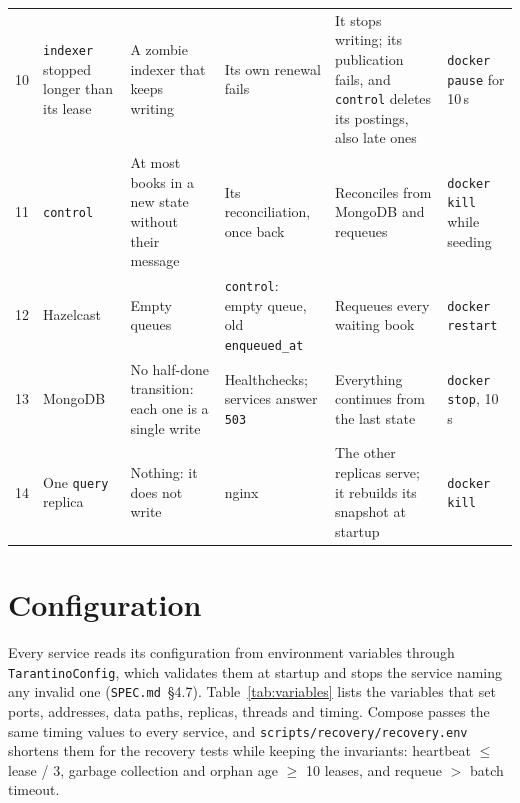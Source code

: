 \documentclass[11pt,a4paper]{article}
\newcommand{\code}[1]{\nolinkurl{#1}}
\newcommand{\spec}[1]{\code{SPEC.md}~\S#1}
\begin{document}
\begin{table}[!ht]
\begin{tabularx}{\textwidth}{@{}L{0.65cm}L{2.75cm}L{2.85cm}L{2.2cm}YL{2.65cm}@{}}
10 & \code{indexer} stopped longer than its lease & A zombie indexer that keeps writing & Its own renewal fails & It stops writing; its publication fails, and \code{control} deletes its postings, also late ones & \code{docker pause} for 10\,s \\
11 & \code{control} & At most books in a new state without their message & Its reconciliation, once back & Reconciles from MongoDB and requeues & \code{docker kill} while seeding \\
12 & Hazelcast & Empty queues & \code{control}: empty queue, old \code{enqueued_at} & Requeues every waiting book & \code{docker restart} \\
13 & MongoDB & No half-done transition: each one is a single write & Healthchecks; services answer \code{503} & Everything continues from the last state & \code{docker stop}, 10\,s \\
14 & One \code{query} replica & Nothing: it does not write & nginx & The other replicas serve; it rebuilds its snapshot at startup & \code{docker kill} \\
\bottomrule
\end{tabularx}
\end{table}
\clearpage
\section{Configuration}
\label{app:config}

Every service reads its configuration from environment variables through \code{TarantinoConfig}, which validates
them at startup and stops the service naming any invalid one (\spec{4.7}). Table~\ref{tab:variables} lists the
variables that set ports, addresses, data paths, replicas, threads and timing. Compose passes the same timing values to
every service, and \code{scripts/recovery/recovery.env} shortens them for the recovery tests while keeping the
invariants: heartbeat $\leq$ lease / 3, garbage collection and orphan age $\geq$ 10 leases, and requeue $>$ batch
timeout.
\end{document}
